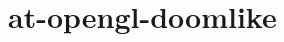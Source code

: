 \chapter{at-\/opengl-\/doomlike}
\hypertarget{md__r_e_a_d_m_e}{}\label{md__r_e_a_d_m_e}
\label{md__r_e_a_d_m_e_autotoc_md0}%
%
